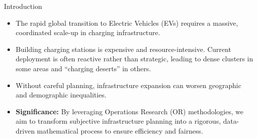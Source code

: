 \documentclass[aspectratio=169,10pt]{beamer}
\begin{document}
\begin{frame}{Introduction}

\vspace{0.35cm}

\begin{itemize}

    \item The rapid global transition to Electric Vehicles (EVs) requires a massive, coordinated scale-up in charging infrastructure.

    \vspace{0.35cm}

    \item Building charging stations is expensive and resource-intensive. Current deployment is often reactive rather than strategic, leading to dense clusters in some areas and ``charging deserts'' in others.

    \vspace{0.35cm}

    \item Without careful planning, infrastructure expansion can worsen geographic and demographic inequalities.

    \vspace{0.35cm}

    \item \textbf{Significance:} By leveraging Operations Research (OR) methodologies, we aim to transform subjective infrastructure planning into a rigorous, data-driven mathematical process to ensure efficiency and fairness.

\end{itemize}

\end{frame}
\end{document}
